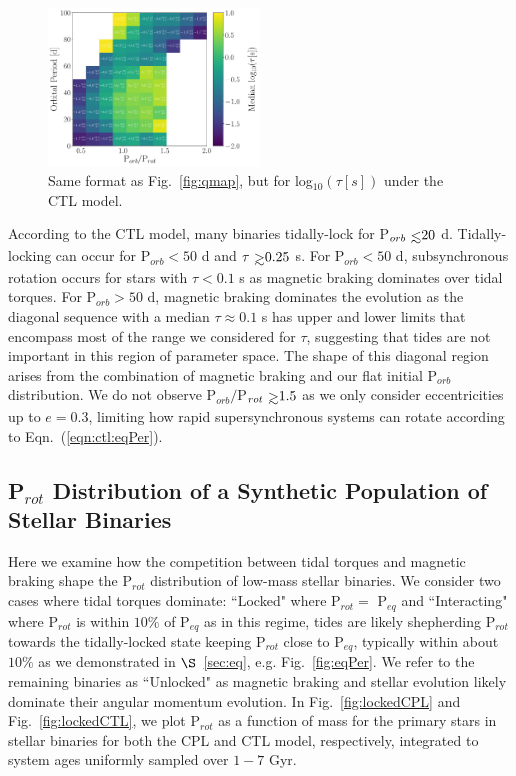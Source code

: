 \documentclass[twocolumn]{aastex61}
\def\gsim{~\rlap{$>$}{\lower 1.0ex\hbox{$\sim$}}}
\def\lsim{~\rlap{$<$}{\lower 1.0ex\hbox{$\sim$}}}
\begin{document}
\begin{figure}
	\includegraphics[width=0.5\textwidth]{../Plots/porbProtPorbTauHist.pdf}
   \caption{Same format as Fig.~\ref{fig:qmap}, but for log$_{10}(\tau [s])$ under the CTL model. }%
    \label{fig:taumap}%
\end{figure}

According to the CTL model, many binaries tidally-lock for P$_{orb} \lsim 20$ d. Tidally-locking can occur for P$_{orb} < 50$ d and $\tau \gsim 0.25$ s.  For P$_{orb} < 50$ d, subsynchronous rotation occurs for stars with $\tau < 0.1$ s as magnetic braking dominates over tidal torques.  For P$_{orb} > 50$ d, magnetic braking dominates the evolution as the diagonal sequence with a median $\tau \approx 0.1$ s has upper and lower limits that encompass most of the range we considered for $\tau$, suggesting that tides are not important in this region of parameter space.  The shape of this diagonal region arises from the combination of magnetic braking and our flat initial P$_{orb}$ distribution. We do not observe P$_{orb}/$P$_{rot} \gsim 1.5$ as we only consider eccentricities up to $e = 0.3$, limiting how rapid supersynchronous systems can rotate according to Eqn.~(\ref{eqn:ctl:eqPer}).

\subsection{P$_{rot}$ Distribution of a Synthetic Population of Stellar Binaries} \label{sec:protDist}

Here we examine how the competition between tidal torques and magnetic braking shape the P$_{rot}$ distribution of low-mass stellar binaries.  We consider two cases where tidal torques dominate: ``Locked" where P$_{rot} = $ P$_{eq}$ and ``Interacting" where P$_{rot}$ is within $10\%$ of P$_{eq}$ as in this regime, tides are likely shepherding P$_{rot}$ towards the tidally-locked state keeping P$_{rot}$ close to P$_{eq}$, typically within about $10\%$ as we demonstrated in $\S$~\ref{sec:eq}, e.g. Fig.~\ref{fig:eqPer}. We refer to the remaining binaries as ``Unlocked" as magnetic braking and stellar evolution likely dominate their angular momentum evolution.  In Fig.~\ref{fig:lockedCPL} and Fig.~\ref{fig:lockedCTL}, we plot P$_{rot}$ as a function of mass for the primary stars in stellar binaries for both the CPL and CTL model, respectively, integrated to system ages uniformly sampled over $1-7$ Gyr.  
\end{document}
